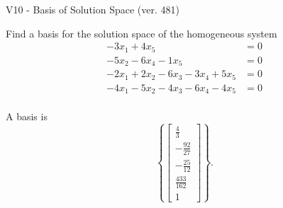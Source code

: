 \begin{exercise}
  \begin{exerciseTitle}V10 - Basis of Solution Space (ver. 481)\end{exerciseTitle}
  \begin{exerciseStatement}
    Find a basis for the solution space of the homogeneous system 
\begin{align*}
 -3 x_ 1 + 4 x_ 5 &= 0  \\ 
  -5 x_ 2 -6 x_ 4 -1 x_ 5 &= 0  \\ 
  -2 x_ 1 + 2 x_ 2 -6 x_ 3 -3 x_ 4 + 5 x_ 5 &= 0  \\ 
  -4 x_ 1 -5 x_ 2 -4 x_ 3 -6 x_ 4 -4 x_ 5 &= 0  \\ 
 \end{align*}


 
  \end{exerciseStatement}

  \begin{exerciseAnswer}
   A basis is   
\[\left\{\left[\begin{array}{c}
\frac{4}{3} \\
-\frac{92}{27} \\
-\frac{25}{12} \\
\frac{433}{162} \\
1
\end{array}\right]\right\}.\]

  


  \end{exerciseAnswer}
\end{exercise}